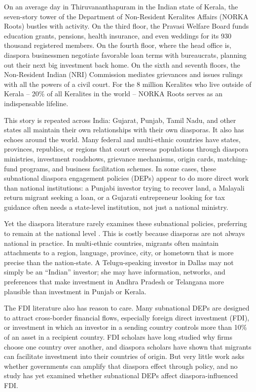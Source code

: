 \documentclass[12pt]{article}
\begin{document}
On an average day in Thiruvananthapuram in the Indian state of Kerala, the seven-story tower of the Department of Non-Resident Keralites Affairs (NORKA Roots) bustles with activity. On the third floor, the Pravasi Welfare Board funds education grants, pensions, health insurance, and even weddings for its 930 thousand registered members. On the fourth floor, where the head office is, diaspora businessmen negotiate favorable loan terms with bureaucrats, planning out their next big investment back home. On the sixth and seventh floors, the Non-Resident Indian (NRI) Commission mediates grievances and issues rulings with all the powers of a civil court. For the 8 million Keralites who live outside of Kerala -- 20\% of all Keralites in the world -- NORKA Roots serves as an indispensable lifeline.

This story is repeated across India: Gujarat, Punjab, Tamil Nadu, and other states all maintain their own relationships with their own diasporas. It also has echoes around the world. Many federal and multi-ethnic countries have states, provinces, republics, or regions that court overseas populations through diaspora ministries, investment roadshows, grievance mechanisms, origin cards, matching-fund programs, and business facilitation schemes. In some cases, these subnational diaspora engagement policies (DEPs) appear to do more direct work than national institutions: a Punjabi investor trying to recover land, a Malayali return migrant seeking a loan, or a Gujarati entrepreneur looking for tax guidance often needs a state-level institution, not just a national ministry.

Yet the diaspora literature rarely examines these subnational policies, preferring to remain at the national level \citep{gazzotti_embracing_2023}. This is costly because diasporas are not always national in practice. In multi-ethnic countries, migrants often maintain attachments to a region, language, province, city, or hometown that is more precise than the nation-state. A Telugu-speaking investor in Dallas may not simply be an ``Indian'' investor; she may have information, networks, and preferences that make investment in Andhra Pradesh or Telangana more plausible than investment in Punjab or Kerala.

The FDI literature also has reason to care. Many subnational DEPs are designed to attract cross-border financial flows, especially foreign direct investment (FDI), or investment in which an investor in a sending country controls more than 10\% of an asset in a recipient country. FDI scholars have long studied why firms choose one country over another, and diaspora scholars have shown that migrants can facilitate investment into their countries of origin. But very little work asks whether governments can amplify that diaspora effect through policy, and no study has yet examined whether subnational DEPs affect diaspora-influenced FDI.
\end{document}
